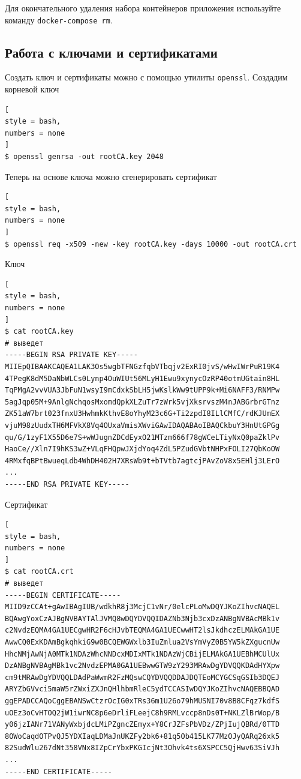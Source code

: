 \documentclass[%
	11pt,
	a4paper,
	utf8,
		]{article}
\begin{document}
Для окончательного удаления набора контейнеров приложения используйте команду \texttt{docker-compose rm}.



\subsection{Работа с ключами и сертификатами}

Создать ключ и сертификаты можно с помощью утилиты \texttt{openssl}. Создадим корневой ключ
\begin{lstlisting}[
style = bash,
numbers = none
]
$ openssl genrsa -out rootCA.key 2048
\end{lstlisting}

Теперь на основе ключа можно сгенерировать сертификат
\begin{lstlisting}[
style = bash,
numbers = none
]
$ openssl req -x509 -new -key rootCA.key -days 10000 -out rootCA.crt
\end{lstlisting}

Ключ
\begin{lstlisting}[
style = bash,
numbers = none
]
$ cat rootCA.key
# выведет
-----BEGIN RSA PRIVATE KEY-----
MIIEpQIBAAKCAQEA1LAK3Os5wgbTFNGzfqbVTbqjv2ExRI0jvS/wHwIWrPuR19K4
4TPegK8dM5DaNbWLCs0Lynp4OuWIUt56MLyH1Ewu9xynycOzRP40otmUGtain8HL
TqPMgA2vvVUA3JbFuN1wsyI9mCdxkSbLH5jwKslkWw9tUPP9k+Mi6NAFF3/RNMPw
5agJqp05M+9AnlgNchqosMxomdQpkXLZuTr7zWrk5vjXksrvszM4nJABGrbrGTnz
ZK51aW7brt023fnxU3HwhmkKthvE8oYhyM23c6G+Ti2zpdI8ILlCMfC/rdKJUmEX
vjuM98zUudxTH6MFVkX8Vq4OUxaVmisXWviGAwIDAQABAoIBAQCkbuY3HnUtGPGg
qu/G/1zyF1X55D6e7S+wWJugnZDCdEyxO21MTzm666f78gWCeLTiyNxQ0paZklPv
HaoCe//Xln7I9hKS3wZ+VLqFHQpwJXjdYoq4ZdL5PZudGVbtNHPxFOLI27QbKoOW
4RMxfqBPtBwueqLdb4WhDH402H7XRsWb9t+bTVtb7agtcjPAvZoV8x5EHlj3LErO
...
-----END RSA PRIVATE KEY-----
\end{lstlisting}

Сертификат
\begin{lstlisting}[
style = bash,
numbers = none
]
$ cat rootCA.crt
# выведет
-----BEGIN CERTIFICATE-----
MIID9zCCAt+gAwIBAgIUB/wdkhR8j3McjC1vNr/0elcPLoMwDQYJKoZIhvcNAQEL
BQAwgYoxCzAJBgNVBAYTAlJVMQ8wDQYDVQQIDAZNb3Njb3cxDzANBgNVBAcMBk1v
c2NvdzEQMA4GA1UECgwHR2F6cHJvbTEQMA4GA1UECwwHT2lsJkdhczELMAkGA1UE
AwwCQ0ExKDAmBgkqhkiG9w0BCQEWGWxlb3IuZmlua2VsYmVyZ0B5YW5kZXgucnUw
HhcNMjAwNjA0MTk1NDAzWhcNNDcxMDIxMTk1NDAzWjCBijELMAkGA1UEBhMCUlUx
DzANBgNVBAgMBk1vc2NvdzEPMA0GA1UEBwwGTW9zY293MRAwDgYDVQQKDAdHYXpw
cm9tMRAwDgYDVQQLDAdPaWwmR2FzMQswCQYDVQQDDAJDQTEoMCYGCSqGSIb3DQEJ
ARYZbGVvci5maW5rZWxiZXJnQHlhbmRleC5ydTCCASIwDQYJKoZIhvcNAQEBBQAD
ggEPADCCAQoCggEBANSwCtzrOcIG0xTRs36m1U26o79hMUSNI70v8B8CFqz7kdfS
uOEz3oCvHTOQ2jW1iwrNC8p6eDrliFLeejC8h9RMLvccp8nDs0T+NKLZlBrWop/B
y06jzIANr71VANyWxbjdcLMiPZgncZEmyx+Y8CrJZFsPbVDz/ZPjIujQBRd/0TTD
8OWoCaqdOTPvQJ5YDXIaqLDMaJnUKZFy2bk6+81q5Ob415LK77MzOJyQARq26xk5
82SudWlu267dNt358VNx8IZpCrYbxPKGIcjNt3Ohvk4ts6XSPCC5QjHwv63SiVJh
...
-----END CERTIFICATE-----
\end{lstlisting}
\end{document}
